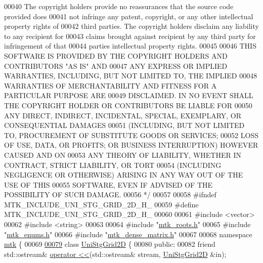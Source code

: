 \begin{DoxyCode}
00040 \textcolor{comment}{The copyright holders provide no reassurances that the source code provided does}
00041 \textcolor{comment}{not infringe any patent, copyright, or any other intellectual property rights of}
00042 \textcolor{comment}{third parties. The copyright holders disclaim any liability to any recipient for}
00043 \textcolor{comment}{claims brought against recipient by any third party for infringement of that}
00044 \textcolor{comment}{parties intellectual property rights.}
00045 \textcolor{comment}{}
00046 \textcolor{comment}{THIS SOFTWARE IS PROVIDED BY THE COPYRIGHT HOLDERS AND CONTRIBUTORS "AS IS" AND}
00047 \textcolor{comment}{ANY EXPRESS OR IMPLIED WARRANTIES, INCLUDING, BUT NOT LIMITED TO, THE IMPLIED}
00048 \textcolor{comment}{WARRANTIES OF MERCHANTABILITY AND FITNESS FOR A PARTICULAR PURPOSE ARE}
00049 \textcolor{comment}{DISCLAIMED. IN NO EVENT SHALL THE COPYRIGHT HOLDER OR CONTRIBUTORS BE LIABLE FOR}
00050 \textcolor{comment}{ANY DIRECT, INDIRECT, INCIDENTAL, SPECIAL, EXEMPLARY, OR CONSEQUENTIAL DAMAGES}
00051 \textcolor{comment}{(INCLUDING, BUT NOT LIMITED TO, PROCUREMENT OF SUBSTITUTE GOODS OR SERVICES;}
00052 \textcolor{comment}{LOSS OF USE, DATA, OR PROFITS; OR BUSINESS INTERRUPTION) HOWEVER CAUSED AND ON}
00053 \textcolor{comment}{ANY THEORY OF LIABILITY, WHETHER IN CONTRACT, STRICT LIABILITY, OR TORT}
00054 \textcolor{comment}{(INCLUDING NEGLIGENCE OR OTHERWISE) ARISING IN ANY WAY OUT OF THE USE OF THIS}
00055 \textcolor{comment}{SOFTWARE, EVEN IF ADVISED OF THE POSSIBILITY OF SUCH DAMAGE.}
00056 \textcolor{comment}{*/}
00057 
00058 \textcolor{preprocessor}{#ifndef MTK\_INCLUDE\_UNI\_STG\_GRID\_2D\_H\_}
00059 \textcolor{preprocessor}{#define MTK\_INCLUDE\_UNI\_STG\_GRID\_2D\_H\_}
00060 
00061 \textcolor{preprocessor}{#include <vector>}
00062 \textcolor{preprocessor}{#include <string>}
00063 
00064 \textcolor{preprocessor}{#include "\hyperlink{mtk__roots_8h}{mtk\_roots.h}"}
00065 \textcolor{preprocessor}{#include "\hyperlink{mtk__enums_8h}{mtk\_enums.h}"}
00066 \textcolor{preprocessor}{#include "\hyperlink{mtk__dense__matrix_8h}{mtk\_dense\_matrix.h}"}
00067 
00068 \textcolor{keyword}{namespace }\hyperlink{namespacemtk}{mtk} \{
00069 
\hypertarget{mtk__uni__stg__grid__2d_8h_source_l00079}{}\hyperlink{classmtk_1_1UniStgGrid2D}{00079} \textcolor{keyword}{class }\hyperlink{classmtk_1_1UniStgGrid2D}{UniStgGrid2D} \{
00080  \textcolor{keyword}{public}:
00082   \textcolor{keyword}{friend} std::ostream& \hyperlink{classmtk_1_1UniStgGrid2D_a7ede04686da0941288d2078a0c3bab70}{operator <<}(std::ostream& stream, \hyperlink{classmtk_1_1UniStgGrid2D}{UniStgGrid2D} &in);

\end{DoxyCode}
